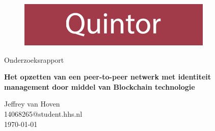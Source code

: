 \documentclass[a4paper,10pt]{report}
\begin{document}
  
  \begin{titlepage}
    \begin{figure}
      \includegraphics[width=\textwidth]{quintor}
      \vspace{1cm}    
    \end{figure}

    {\huge\centering Onderzoeksrapport \par}
    \vspace{1cm}    
    {\large\bfseries\centering
      Het opzetten van een peer-to-peer netwerk met identiteit \\
      management door middel van Blockchain technologie
    \par}

    \vfill

    \begin{flushleft}
      Jeffrey van Hoven \\
      14068265@student.hhs.nl \\
      \today
    \end{flushleft}
  \end{titlepage}

  
  

  \newpage
  \tableofcontents

  
  
  
  

  \setlength\bibsep{\baselineskip}  
  
  
  
\end{document}

